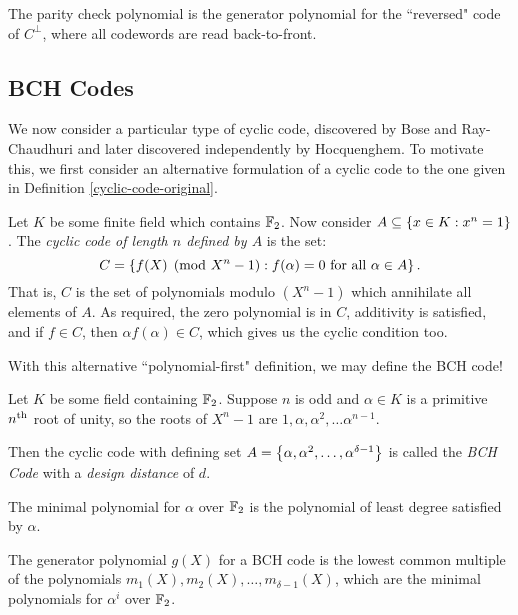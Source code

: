 \documentclass{article}
\begin{document}
\begin{corollary}
    The parity check polynomial is the generator polynomial for the ``reversed" code of $C^\bot$, where all codewords are read back-to-front.
\end{corollary}


\subsection{BCH Codes}

We now consider a particular type of cyclic code, discovered by Bose and Ray-Chaudhuri and later discovered independently by Hocquenghem. To motivate this, we first consider an alternative formulation of a cyclic code to the one given in Definition \ref{cyclic-code-original}.

\begin{definition}
    Let $K$ be some finite field which contains $\mathbb{F}_2$. Now consider $A \subseteq \left\lbrace x \in K : x^n = 1 \right\rbrace$. The \textit{cyclic code of length $n$ defined by $A$} is the set:
    \[
	C = \left\lbrace f(X) \pmod{X^n-1} : f(\alpha) = 0 \text{ for all } \alpha \in A \right\rbrace.
	\]
	That is, $C$ is the set of polynomials modulo $(X^n-1)$ which annihilate all elements of $A$. As required, the zero polynomial is in $C$, additivity is satisfied, and if $f \in C$, then $\alpha f(\alpha) \in C$, which gives us the cyclic condition too.
\end{definition}

With this alternative ``polynomial-first" definition, we may define the BCH code!

\begin{definition}
    Let $K$ be some field containing $\mathbb{F}_2$. Suppose $n$ is odd and $\alpha \in K$ is a primitive $n^{\text{th}}$ root of unity, so the roots of $X^n-1$ are $1, \alpha, \alpha^2, \dots \alpha^{n-1}$.
    
    Then the cyclic code with defining set $A = \left\lbrace \alpha, \alpha^2, \dots, \alpha^{\delta-1} \right\rbrace$ is called the \textit{BCH Code} with a \textit{design distance} of $d$.
\end{definition}

\begin{note}
    The minimal polynomial for $\alpha$ over $\mathbb{F}_2$ is the polynomial of least degree satisfied by $\alpha$.
\end{note}

\begin{corollary}
    The generator polynomial $g(X)$ for a BCH code is the lowest common multiple of the polynomials $m_1(X), m_2(X), \dots, m_{\delta-1}(X)$, which are the minimal polynomials for $\alpha^i$ over $\mathbb{F}_2$.
\end{corollary}
\end{document}

